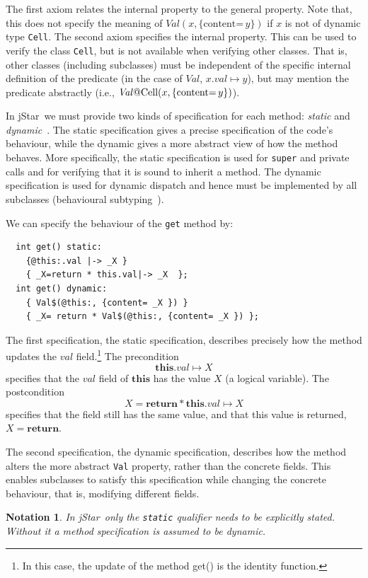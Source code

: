 \documentclass[11pt]{article}
\newcommand{\jStar}{{\sf jStar}}
\newcommand{\Val}{\mathit{Val}}
\newcommand{\content}[1]{\{\text{content=} \, #1 \}}
\newcommand{\this}{\mathbf{this}}
\newcommand{\return}{\mathbf{return}}
\newtheorem{notation}{Notation}
\def\J{\lstinline}
\newcommand{\JS}[1]{$\mathit{#1}$}
\begin{document}
The first axiom relates the internal property to the general property.  Note
that, this does not specify the meaning of $\Val(x,\content y)$ if $x$
is not of dynamic type \J~Cell~.  The second axiom specifies the internal
property.  This can be used to verify the class  \J~Cell~, but is not available
when verifying other classes.  That is, other classes (including
subclasses) must be independent of the specific internal definition of
the predicate (in the case of $\Val$, $ x.val \mapsto y$),
 but may mention the predicate abstractly (i.e., $\Val\J~@Cell~(x,\content y)$).



In \jStar \ we must provide two kinds of specification for each method: {\em static}
and {\em dynamic}~\cite{PB08,chin08}.  The static specification gives a precise specification of the code's behaviour, while the
dynamic gives a more abstract view of how the method
behaves.  More specifically, the static specification is used for
\J~super~ and private calls and for verifying that it is sound to inherit a
method.  The dynamic specification is used for dynamic dispatch
and hence must be implemented by all subclasses (behavioural
subtyping~\cite{liskov94}).

We can specify the behaviour of the \J~get~ method by:
\begin{verbatim}
  int get() static:
    {@this:.val |-> _X }
    { _X=return * this.val|-> _X  };
  int get() dynamic:
    { Val$(@this:, {content= _X }) } 
    { _X= return * Val$(@this:, {content= _X }) };
\end{verbatim}
%
The first specification, the static specification, describes precisely
how the method updates the \JS{val} field.\footnote{In this case, the
  update of the method get() is the identity function.}  The
precondition $$\this.val \mapsto X$$ specifies that the \JS{val}
field of $\this$ has the value \JS{X} (a logical
variable). 
The postcondition $$X=\return * \this.val \mapsto X$$  specifies that the
field still has the same value, and that this value is returned,
$X=\return$.

The second specification, the dynamic specification, describes how the
method alters the more abstract \J~Val~ property, rather than the
concrete fields.  This enables subclasses to satisfy this
specification while changing the concrete behaviour, that is,
modifying different fields.

\begin{notation}
In \jStar \ only the {\tt static}
  qualifier needs to be explicitly stated. Without it 
  a method specification is assumed to be dynamic.
\end{notation}
\end{document}
